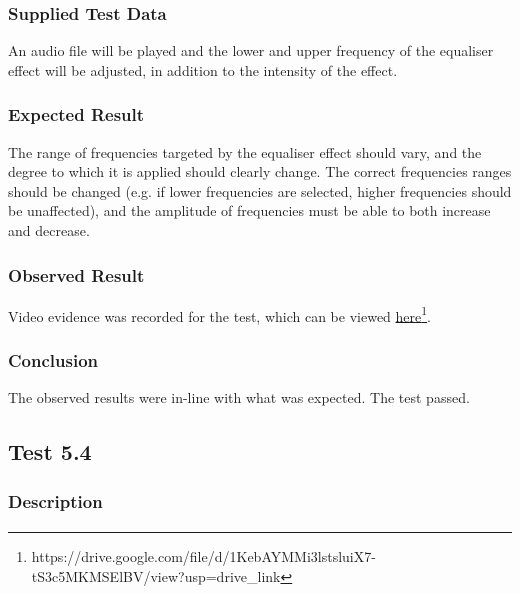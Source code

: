 \subsubsection*{Supplied Test Data}
An audio file will be played and the lower and upper frequency of the equaliser effect will be adjusted, in addition to the intensity of the effect.

\subsubsection*{Expected Result}
The range of frequencies targeted by the equaliser effect should vary, and the degree to which it is applied should clearly change. The correct frequencies ranges should be changed (e.g. if lower frequencies are selected, higher frequencies should be unaffected), and the amplitude of frequencies must be able to both increase and decrease.

\subsubsection*{Observed Result}
\label{sec:evidence5.3}
Video evidence was recorded for the test, which can be viewed \href{https://drive.google.com/file/d/1KebAYMMi3lstsluiX7-tS3c5MKMSElBV/view?usp=drive_link}{here}\footnote{
	https://drive.google.com/file/d/1KebAYMMi3lstsluiX7-tS3c5MKMSElBV/view?usp=drive\_link
}.

\subsubsection*{Conclusion}
The observed results were in-line with what was expected. The test passed.


\pagebreak
\subsection{Test 5.4}
\subsubsection*{Description}
\paragraph{}
{
	\centering
}

